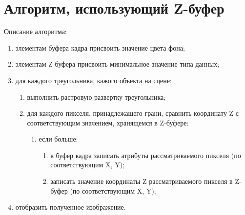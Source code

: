 \documentclass[12pt]{report}
\begin{document}
	\section{Алгоритм, использующий Z-буфер}
	
	Описание алгоритма:
	\begin{enumerate}
		\item элементам буфера кадра присвоить значение цвета фона;
		\item элементам Z-буфера присвоить минимальное значение типа данных;
		\item для каждого треугольника, кажого объекта на сцене:
		\begin{enumerate}
			\item выполнить растровую развертку треугольника;
			\item для каждого пикселя, принадлежащего грани, сравнить координату Z с соответствующим значением, хранящемся в Z-буфере:
			\begin{enumerate}
				\item если больше: 
				\begin{enumerate}
					\item в буфер кадра записать атрибуты рассматриваемого пикселя (по соответствующим X, Y);
					\item записать значение координаты Z рассматриваемого пикселя в Z-буфер (по соответствующим X, Y);
				\end{enumerate}	
			\end{enumerate}
		\end{enumerate}
		\item отобразить полученное изображение.
	\end{enumerate}
\end{document}
